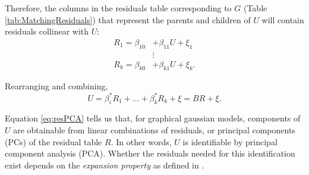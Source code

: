 \documentclass[letterpaper]{article}
\begin{document}
\begin{center}
\begin{table}[ht]
\centering
{}
\qquad
\qquad
\qquad
\qquad
{}
\caption{The training data frame (Variables) implies a matching data frame (Residuals) once the joint distribution of all variables is specified via a graph and its parameterization}
\label{tab:MatchingResiduals}
\end{table}
\end{center}

Therefore, the columns in the residuals table corresponding to $G$ (Table \ref{tab:MatchingResiduals}) that represent the parents and children of $U$ will contain residuals collinear with $U$:
\begin{equation}
\begin{split}
R_1 = \beta_{10} &+ \beta_{11} U + \xi_1\\
& \vdots\\
R_k = \beta_{k0} &+ \beta_{k1} U + \xi_k.
\end{split}
\end{equation}

Rearranging and combining,
\begin{equation}
U = \beta_i^{*} R_1 + \dots + \beta_k^{*} R_k + \xi = B R + \xi.
\label{eq:resPCA}
\end{equation}

Equation \ref{eq:resPCA} tells us that, for graphical gaussian models, components of $U$ are obtainable from linear combinations of residuals, or principal components (PCs) of the residual table $R$.  In other words, $U$ is identifiable by principal component analysis (PCA).  Whether the residuals needed for this identification exist depends on the \textit{expansion property} as defined in \cite{anandkumar_learning_2013}.
\end{document}
